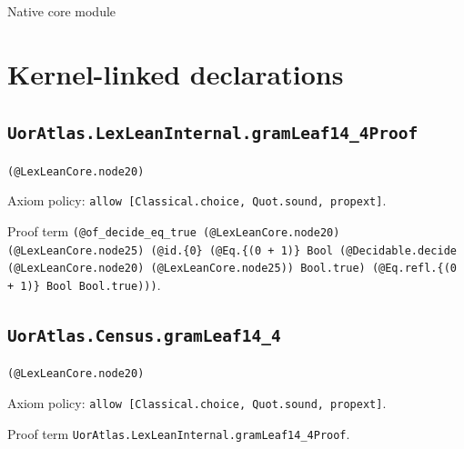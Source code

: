 \documentclass[11pt]{article}
\begin{document}
\begin{center}{\LARGE Native core module}\end{center}
\section*{Kernel-linked declarations}
\subsection*{\texttt{UorAtlas.LexLeanInternal.gramLeaf14\_4Proof}}
\noindent\texttt{(@LexLeanCore.node20)}\par
\noindent Axiom policy: \texttt{allow [Classical.choice, Quot.sound, propext]}.\par
\noindent Proof term \texttt{(@of\_decide\_eq\_true (@LexLeanCore.node20) (@LexLeanCore.node25) (@id.\{0\} (@Eq.\{(0 + 1)\} Bool (@Decidable.decide (@LexLeanCore.node20) (@LexLeanCore.node25)) Bool.true) (@Eq.refl.\{(0 + 1)\} Bool Bool.true)))}.\par
\subsection*{\texttt{UorAtlas.Census.gramLeaf14\_4}}
\noindent\texttt{(@LexLeanCore.node20)}\par
\noindent Axiom policy: \texttt{allow [Classical.choice, Quot.sound, propext]}.\par
\noindent Proof term \texttt{UorAtlas.LexLeanInternal.gramLeaf14\_4Proof}.\par
\end{document}
